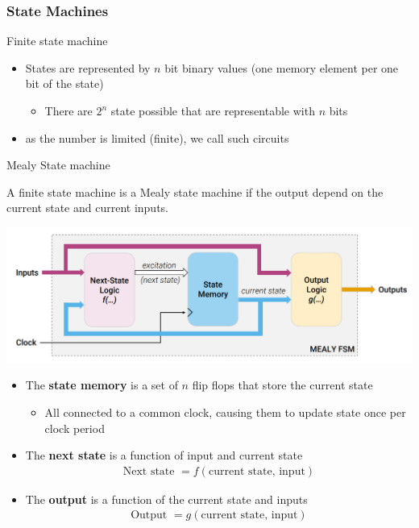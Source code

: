 \subsubsection{State Machines}
\begin{parag}{Finite state machine}
    \begin{itemize}
        Because circuits containing combinational and sequential logic have a state, we call them \textbf{state machines}
        \item States are represented by $n$ bit binary values (one memory element per one bit of the state)
            \begin{itemize}
                \item There are $2^n$ state possible that are representable with $n$ bits
            \end{itemize}
             \item as the number is limited (finite), we call such circuits 
    \end{itemize}
\end{parag}
\begin{parag}{Mealy State machine}
    \begin{definition}
    A finite state machine is a Mealy state machine if the output depend on the current state and current inputs.
    \end{definition}
\begin{center}
    \includegraphics[scale=0.5]{102025-06-20.png}
\end{center}
\begin{itemize}
    \item The \textbf{state memory} is a set of $n$ flip flops that store the current state
        \begin{itemize}
            \item All connected to a common clock, causing them to update state once per clock period
        \end{itemize}
    \item The \textbf{next state} is a function of input and current state
        \begin{align*} \text{Next state } = f\left( \text{current state, input}\right) \end{align*}
    \item The \textbf{ output} is a function of the current state and inputs
        \begin{align*} \text{Output } = g\left(\text{current state, input}\right) \end{align*}
\end{itemize}
\end{parag}

